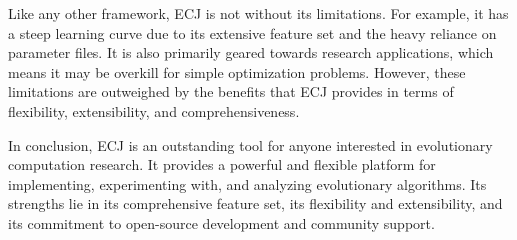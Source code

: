 Like any other framework, ECJ is not without its limitations. For example, it has a steep learning curve due to its extensive feature set and the heavy reliance on parameter files. It is also primarily geared towards research applications, which means it may be overkill for simple optimization problems. However, these limitations are outweighed by the benefits that ECJ provides in terms of flexibility, extensibility, and comprehensiveness.

In conclusion, ECJ is an outstanding tool for anyone interested in evolutionary computation research. It provides a powerful and flexible platform for implementing, experimenting with, and analyzing evolutionary algorithms. Its strengths lie in its comprehensive feature set, its flexibility and extensibility, and its commitment to open-source development and community support.
